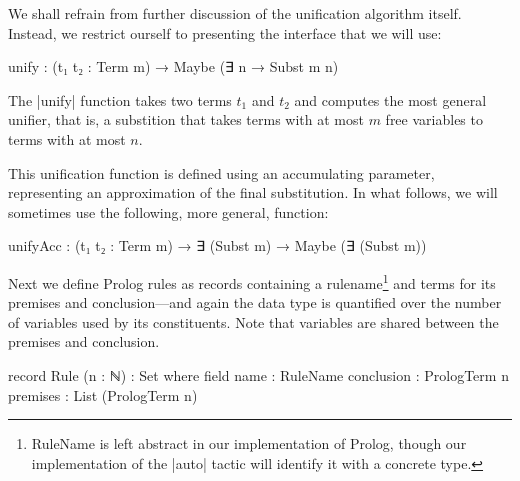 \documentclass[preprint]{sigplanconf}
\begin{document}

We shall refrain from further discussion of the unification algorithm itself.
Instead, we restrict ourself to presenting the interface that we will use:
\begin{code}
  unify : (t₁ t₂ : Term m) → Maybe (∃ n → Subst m n)
\end{code}
The |unify| function takes two terms $t_1$ and $t_2$ and computes the most general
unifier, that is, a substition that takes terms with at most $m$ free
variables to terms with at most $n$.


This unification function is defined using an accumulating parameter,
representing an approximation of the final substitution. In what
follows, we will sometimes use the following, more general, function:
\begin{code}
  unifyAcc : (t₁ t₂ : Term m) →
    ∃ (Subst m) → Maybe (∃ (Subst m))
\end{code}

Next we define Prolog rules as records containing a rulename\footnote{
  RuleName is left abstract in our implementation of Prolog, though
  our implementation of the |auto| tactic will identify it with a
  concrete type.
} and terms for its
premises and conclusion---and again the data type is quantified over
the number of variables used by its constituents. Note that variables
are shared between the premises and conclusion.

\begin{code}
  record Rule (n : ℕ) : Set where
    field
      name        : RuleName
      conclusion  : PrologTerm n
      premises    : List (PrologTerm n)
\end{code}
\end{document}
